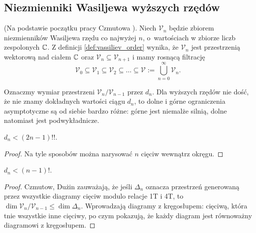 
\subsection{Niezmienniki Wasiljewa wyższych rzędów}
(Na podstawie początku pracy Czmutowa \cite{chmutov2012}).
%
Niech $\mathcal V_n$ będzie zbiorem niezmienników Wasiljewa rzędu co najwyżej $n$, o~wartościach w zbiorze liczb zespolonych $\mathbb C$.
Z definicji \ref{def:vassiliev_order} wynika, że $\mathcal V_n$ jest przestrzenią wektorową nad ciałem $\mathbb C$ oraz $\mathcal V_n \subseteq \mathcal V_{n+1}$ i mamy rosnącą filtrację
\begin{equation}
    \mathcal V_0 \subseteq \mathcal V_1 \subseteq \mathcal V_2 \subseteq \ldots \subseteq \mathcal V := \bigcup_{n=0}^\infty \mathcal V_n.
\end{equation}

Oznaczmy wymiar przestrzeni $\mathcal V_n / \mathcal V_{n-1}$ przez $d_n$.
Dla wyższych rzędów nie dość, że nie znamy dokładnych wartości ciągu $d_n$, to dolne i górne ograniczenia asymptotyczne są od siebie bardzo różne: górne jest niemalże silnią, dolne natomiast jest podwykładnicze.

\begin{proposition}
    $d_n < (2n-1)!!$.
\end{proposition}

\begin{proof}
    Na tyle sposobów można narysować $n$ cięciw wewnątrz okręgu.
\end{proof}

\begin{proposition}
    $d_n < (n-1)!$.
\end{proposition}

\begin{proof}
%
%
%
    Czmutow, Dużin \cite{chmutovduzhin1994} zauważają, że jeśli $\Delta_n$ oznacza przestrzeń generowaną przez wszystkie diagramy cięciw modulo relacje 1T i 4T, to $\dim \mathcal V_n/\mathcal V_{n-1} \le \dim \Delta_n$.
    Wprowadzają diagramy z kręgosłupem: cięciwą, która tnie wszystkie inne cięciwy, po czym pokazują, że każdy diagram jest równoważny diagramowi z kręgosłupem.
\end{proof}

